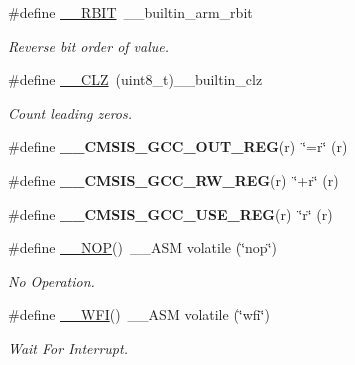 \begin{DoxyCompactItemize}
\#define \mbox{\hyperlink{group___c_m_s_i_s___core___instruction_interface_gab83768933a612816fad669db5488366f}{\+\_\+\+\_\+\+R\+B\+IT}}~\+\_\+\+\_\+builtin\+\_\+arm\+\_\+rbit
\begin{DoxyCompactList}\small\item\em Reverse bit order of value. \end{DoxyCompactList}\item 
\#define \mbox{\hyperlink{group___c_m_s_i_s___core___instruction_interface_ga5d5bb1527e042be4a9fa5a33f65cc248}{\+\_\+\+\_\+\+C\+LZ}}~(uint8\+\_\+t)\+\_\+\+\_\+builtin\+\_\+clz
\begin{DoxyCompactList}\small\item\em Count leading zeros. \end{DoxyCompactList}\item 
\mbox{\label{group___c_m_s_i_s___core___instruction_interface_gabc17e391c13c71702366c67cba39c276}} 
\#define {\bfseries \+\_\+\+\_\+\+C\+M\+S\+I\+S\+\_\+\+G\+C\+C\+\_\+\+O\+U\+T\+\_\+\+R\+EG}(r)~\char`\"{}=r\char`\"{} (r)
\item 
\mbox{\label{group___c_m_s_i_s___core___instruction_interface_ga03179f79efee45c226dddfb8d824ad83}} 
\#define {\bfseries \+\_\+\+\_\+\+C\+M\+S\+I\+S\+\_\+\+G\+C\+C\+\_\+\+R\+W\+\_\+\+R\+EG}(r)~\char`\"{}+r\char`\"{} (r)
\item 
\mbox{\label{group___c_m_s_i_s___core___instruction_interface_ga9d94dee7402367961d2cf0accc00fd97}} 
\#define {\bfseries \+\_\+\+\_\+\+C\+M\+S\+I\+S\+\_\+\+G\+C\+C\+\_\+\+U\+S\+E\+\_\+\+R\+EG}(r)~\char`\"{}r\char`\"{} (r)
\item 
\#define \mbox{\hyperlink{group___c_m_s_i_s___core___instruction_interface_ga0b13f3617dd4af2cd2eb3a311073f717}{\+\_\+\+\_\+\+N\+OP}}()~\+\_\+\+\_\+\+A\+SM volatile (\char`\"{}nop\char`\"{})
\begin{DoxyCompactList}\small\item\em No Operation. \end{DoxyCompactList}\item 
\#define \mbox{\hyperlink{group___c_m_s_i_s___core___instruction_interface_gab28e2b328c4cf23c917ab18a23194f8e}{\+\_\+\+\_\+\+W\+FI}}()~\+\_\+\+\_\+\+A\+SM volatile (\char`\"{}wfi\char`\"{})
\begin{DoxyCompactList}\small\item\em Wait For Interrupt. \end{DoxyCompactList}\item 

\end{DoxyCompactItemize}
